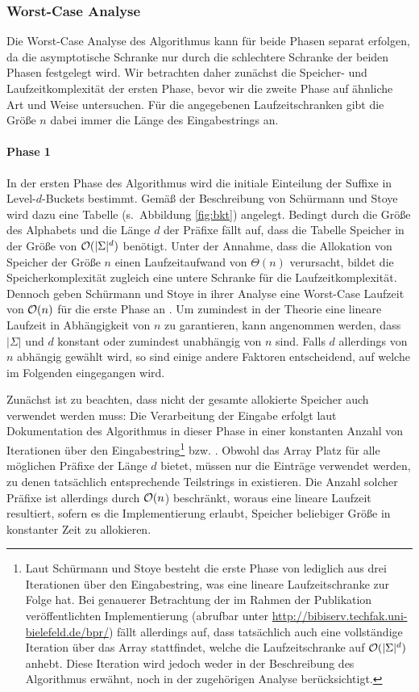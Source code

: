 \subsubsection{Worst-Case Analyse}
\label{bpr:effizienz:theorie}

Die Worst-Case Analyse des Algorithmus kann für beide Phasen separat erfolgen, da die asymptotische Schranke nur durch die schlechtere Schranke der beiden Phasen festgelegt wird. Wir betrachten daher zunächst die Speicher- und Laufzeitkomplexität der ersten Phase, bevor wir die zweite Phase auf ähnliche Art und Weise untersuchen. Für die angegebenen Laufzeitschranken gibt die Größe \(n\) dabei immer die Länge des Eingabestrings an.
\paragraph*{Phase 1}
In der ersten Phase des Algorithmus wird die initiale Einteilung der Suffixe in Level-\(d\)-Buckets bestimmt. Gemäß der Beschreibung von Schürmann und Stoye wird dazu eine Tabelle \bkt (s.~Abbildung \ref{fig:bkt}) angelegt. Bedingt durch die Größe des Alphabets und die Länge \(d\) der Präfixe fällt auf, dass die Tabelle Speicher in der Größe von \(\mathcal{O}(|\Sigma|^d)\) benötigt. Unter der Annahme, dass die Allokation von Speicher der Größe \(n\) einen Laufzeitaufwand von \(\Theta(n)\) verursacht, bildet die Speicherkomplexität zugleich eine untere Schranke für die Laufzeitkomplexität. Dennoch geben Schürmann und Stoye in ihrer Analyse eine Worst-Case Laufzeit von \(\mathcal{O}(n)\) für die erste Phase an \cite[Kapitel 3.2]{saca:2}. Um zumindest in der Theorie eine lineare Laufzeit in Abhängigkeit von \(n\) zu garantieren, kann angenommen werden, dass \(|\Sigma|\) und \(d\) konstant oder zumindest unabhängig von \(n\) sind. Falls \(d\) allerdings von \(n\) abhängig gewählt wird, so sind einige andere Faktoren entscheidend, auf welche im Folgenden eingegangen wird.\par
Zunächst ist zu beachten, dass nicht der gesamte allokierte Speicher auch verwendet werden muss: Die Verarbeitung der Eingabe erfolgt laut Dokumentation des Algorithmus in dieser Phase in einer konstanten Anzahl von Iterationen über den Eingabestring\footnote{Laut Schürmann und Stoye \cite[Kapitel~3.3]{saca:2} besteht die erste Phase von \bpr lediglich aus drei Iterationen über den Eingabestring, was eine lineare Laufzeitschranke zur Folge hat. Bei genauerer Betrachtung der im Rahmen der Publikation veröffentlichten Implementierung (abrufbar unter \url{http://bibiserv.techfak.uni-bielefeld.de/bpr/}) fällt allerdings auf, dass tatsächlich auch eine vollständige Iteration über das Array \bkt stattfindet, welche die Laufzeitschranke auf \(\mathcal{O}(|\Sigma|^d)\) anhebt. Diese Iteration wird jedoch weder in der Beschreibung des Algorithmus erwähnt, noch in der zugehörigen Analyse berücksichtigt.}  bzw. . Obwohl das Array \bkt Platz für alle möglichen Präfixe der Länge \(d\) bietet, müssen nur die Einträge verwendet werden, zu denen tatsächlich entsprechende Teilstrings in  existieren. Die Anzahl solcher Präfixe ist allerdings durch \(\mathcal{O}(n\)) beschränkt, woraus eine lineare Laufzeit resultiert, sofern es die Implementierung erlaubt, Speicher beliebiger Größe in konstanter Zeit zu allokieren.\par
